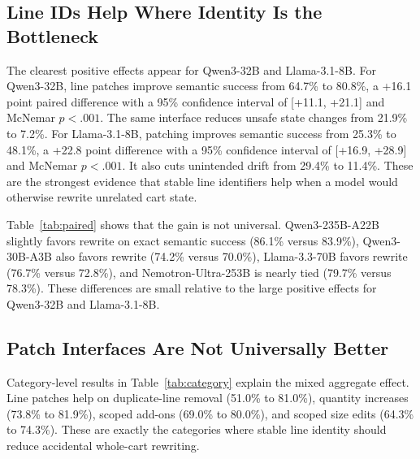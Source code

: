 \documentclass[11pt]{article}
\begin{document}
\begin{table}[H]
\centering
\small
\resizebox{\linewidth}{!}{}
\caption{Main results. Values other than \(n\) are percentages. ``Semantic''
is exact state-update success; ``Unsafe'' is an unsafe accepted or changed
state; ``Drift'' is unintended change to protected cart lines.}
\label{tab:main}
\end{table}

\subsection{Line IDs Help Where Identity Is the Bottleneck}
The clearest positive effects appear for Qwen3-32B and Llama-3.1-8B. For
Qwen3-32B, line patches improve semantic success from 64.7\% to 80.8\%, a
+16.1 point paired difference with a 95\% confidence interval of [+11.1,
+21.1] and McNemar \(p<.001\). The same interface reduces unsafe state changes
from 21.9\% to 7.2\%. For Llama-3.1-8B, patching improves semantic success
from 25.3\% to 48.1\%, a +22.8 point difference with a 95\% confidence
interval of [+16.9, +28.9] and McNemar \(p<.001\). It also cuts unintended
drift from 29.4\% to 11.4\%. These are the strongest evidence that stable line
identifiers help when a model would otherwise rewrite unrelated cart state.

Table~\ref{tab:paired} shows that the gain is not universal. Qwen3-235B-A22B
slightly favors rewrite on exact semantic success (86.1\% versus 83.9\%),
Qwen3-30B-A3B also favors rewrite (74.2\% versus 70.0\%), Llama-3.3-70B favors
rewrite (76.7\% versus 72.8\%), and Nemotron-Ultra-253B is nearly tied
(79.7\% versus 78.3\%). These differences are small relative to the large
positive effects for Qwen3-32B and Llama-3.1-8B.

\begin{table}[H]
\centering
\small
\resizebox{\linewidth}{!}{}
\caption{Paired rewrite-versus-patch comparisons. \(\Delta\) is line patch
minus rewrite in percentage points.}
\label{tab:paired}
\end{table}

\subsection{Patch Interfaces Are Not Universally Better}
Category-level results in Table~\ref{tab:category} explain the mixed aggregate
effect. Line patches help on duplicate-line removal (51.0\% to 81.0\%),
quantity increases (73.8\% to 81.9\%), scoped add-ons (69.0\% to 80.0\%), and
scoped size edits (64.3\% to 74.3\%). These are exactly the categories where
stable line identity should reduce accidental whole-cart rewriting.
\end{document}
